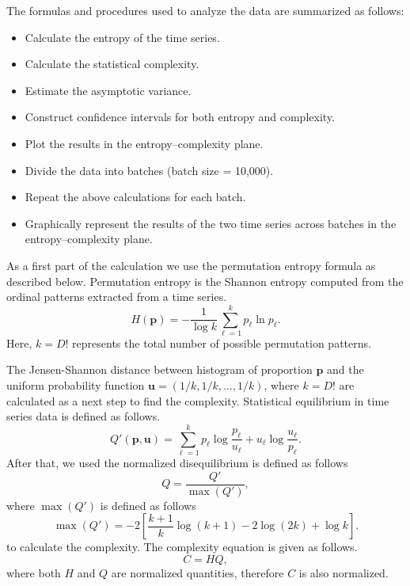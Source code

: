 The formulas and procedures used to analyze the data are summarized as follows:
\begin{itemize}
	\item Calculate the entropy of the time series.
	\item Calculate the statistical complexity.
	\item Estimate the asymptotic variance.
	\item Construct confidence intervals for both entropy and complexity.
	\item Plot the results in the entropy–complexity plane.
	\item Divide the data into batches (batch size = 10,000).
	\item Repeat the above calculations for each batch.
	\item Graphically represent the results of the two time series across batches in the entropy–complexity plane.
\end{itemize}

As a first part of the calculation we use the permutation  entropy formula as described below. Permutation entropy is the Shannon entropy computed from the ordinal patterns extracted from a time series.
\begin{equation}
	H(\mathbf{p})=-\dfrac{1}{\log k}\sum^{k}_{\ell=1}p_{\ell} \ln{p_{\ell}}.
\end{equation}
Here, $k=D!$ represents the total number of possible permutation patterns.

The Jensen-Shannon distance between histogram of proportion $\mathbf{p}$ and the uniform probability function $\mathbf{u}=(1/k, 1/k, \dots, 1/k)$, where $k=D!$ are calculated as a next step to find the complexity. 
Statistical equilibrium in time series data is defined as follows. 
\begin{equation}
	Q'(\mathbf{p,u})=\sum^k_{\ell=1} p_\ell\log\dfrac{p_\ell}{u_\ell}+u_\ell\log\dfrac{u_\ell}{p_\ell}.
\end{equation}
After that, we used the normalized disequilibrium is defined as follows
\begin{equation}
	Q=\dfrac{Q'}{\max{(Q')}},
\end{equation}
where $\max(Q')$ is defined as follows
\begin{equation}
	\max(Q')=-2 \left[\dfrac{k+1}{k}\log(k+1)-2\log(2k)+\log k\right].
\end{equation}
to calculate the complexity.
The complexity equation is given as follows.
\begin{equation}
	C=HQ,
\end{equation}
where both $H$ and $Q$ are normalized quantities, therefore $C$ is also normalized.   

